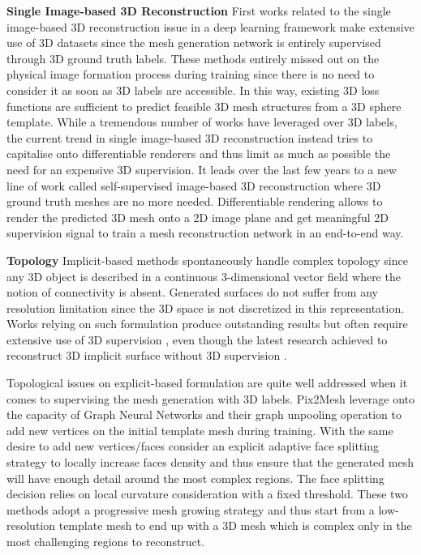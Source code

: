 \noindent\textbf{Single Image-based 3D Reconstruction} First works related to the single image-based 3D reconstruction issue in a deep learning framework \citep{choy20163d,girdhar2016learning,yang2018dense} make extensive use of 3D datasets \citep{chchang2015shapenet,sun2018pix3d} since the mesh generation network is entirely supervised through 3D ground truth labels. These methods entirely missed out on the physical image formation process during training since there is no need to consider it as soon as 3D labels are accessible. In this way, existing 3D loss functions are sufficient to predict feasible 3D mesh structures from a 3D sphere template. While a tremendous number of works have leveraged over 3D labels, the current trend in single image-based 3D reconstruction instead tries to capitalise onto differentiable renderers and thus limit as much as possible the need for an expensive 3D supervision. It leads over the last few years to a new line of work called self-supervised image-based 3D reconstruction  \citep{kanazawa2018learning,li2020self,pavllo2020convolutional,henderson2020leveraging} where 3D ground truth meshes are no more needed. Differentiable rendering allows to render the predicted 3D mesh onto a 2D image plane and get meaningful 2D supervision signal to train a mesh reconstruction network in an end-to-end way. 

\noindent\textbf{Topology} Implicit-based methods spontaneously handle complex topology since any 3D object is described in a continuous 3-dimensional vector field where the notion of connectivity is absent. Generated surfaces do not suffer from any resolution limitation since the 3D space is not discretized in this representation. Works relying on such formulation produce outstanding results but often require extensive use of 3D supervision \citep{saito2020pifuhd}, even though the latest research achieved to reconstruct 3D implicit surface without 3D supervision \citep{niemeyer2020differentiable,liu2019learning}. 

Topological issues on explicit-based formulation are quite well addressed when it comes to supervising the mesh generation with 3D labels. Pix2Mesh \citep{wang2018pixel2mesh} leverage onto the capacity of Graph Neural Networks and their graph unpooling operation to add new vertices on the initial template mesh during training. With the same desire to add new vertices/faces \citep{smith2019geometrics} consider an explicit adaptive face splitting strategy to locally increase faces density and thus ensure that the generated mesh will have enough detail around the most complex regions. The face splitting decision relies on local curvature consideration with a fixed threshold. These two methods adopt a progressive mesh growing strategy and thus start from a low-resolution template mesh to end up with a 3D mesh which is complex only in the most challenging regions to reconstruct.

